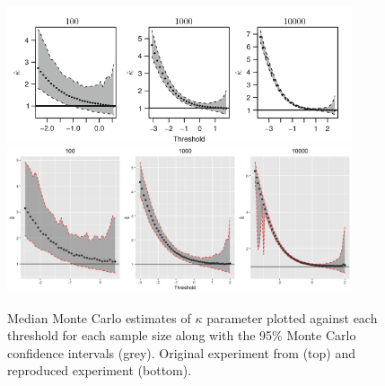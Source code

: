 \documentclass[12pt]{article}
\theoremstyle{definition}
\theoremstyle{definition}
\begin{document}
\begin{figure}[H]
\begin{center}
{\includegraphics[width=4.0in]{project/papafiles/fig3.papa.png}}
{\includegraphics[width=4.0in]{project/papafiles/fig3.me.png}}
\caption{Median Monte Carlo estimates of $\kappa$ parameter plotted against each threshold for each sample size along with the 95\% Monte Carlo confidence intervals (grey). Original experiment from \cite{papatawn}(top) and reproduced experiment (bottom). }
\end{center}
\end{figure}
\end{document}
